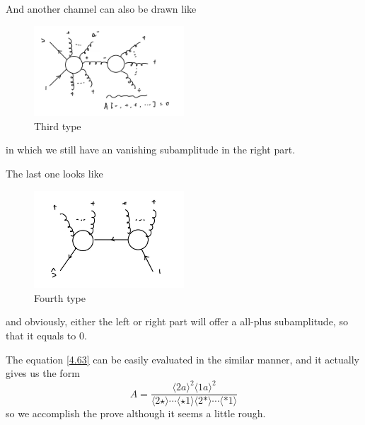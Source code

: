 \documentclass[12pt]{article}
\numberwithin{equation}{section}
\newcommand{\avg}[1]{\langle #1 \rangle}
\newcommand{\asqu}[1]{{\langle#1\rangle}^2}
\begin{document}
And another channel can also be drawn like
\begin{figure}[H]
    \centering
    \includegraphics[width=0.5\textwidth]{npt3.jpg}
    \caption{Third type}
\end{figure}
\noindent
in which we still have an vanishing subamplitude in the right part. 

The last one looks like 
\begin{figure}[H]
    \centering
    \includegraphics[width=0.5\textwidth]{npt4.jpg}
    \caption{Fourth type}
\end{figure}
\noindent
and obviously, either the left or right part will offer a all-plus subamplitude, so that it equals to 0.

The equation \eqref{4.63} can be easily evaluated in the similar manner, and it actually gives us the form
\begin{equation}
    A=\frac{\asqu{2a}\!\asqu{1a}}{\avg{2\star}\cdots \avg{\star 1}\avg{2\ast }\cdots \avg{\ast 1}}
\end{equation}
so we accomplish the prove although it seems a little rough.
\end{document}
